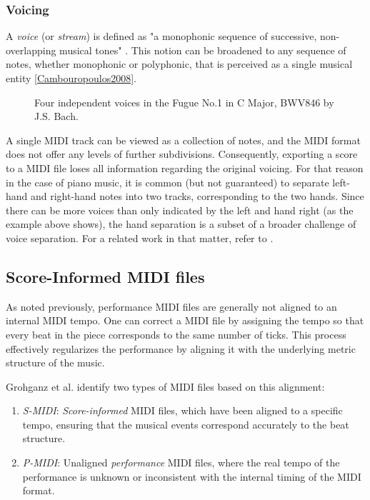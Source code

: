 \subsubsection{Voicing}

A \emph{voice} (or \emph{stream}) is defined as "a monophonic sequence of successive, non-overlapping musical tones" \cite{Karydis2007}. This notion can be broadened to any sequence of notes, whether monophonic or polyphonic, that is perceived as a single musical entity \ref{Cambouropoulos2008}.

\begin{figure}[ht!]
\centering

\caption[Four independent voices in the Fugue No.1 in C Major, BWV846 by J.S. Bach.]{Four independent voices in the Fugue No.1 in C Major, BWV846 by J.S. Bach.}
\end{figure}

A single MIDI track can be viewed as a collection of notes, and the MIDI format does not offer any levels of further subdivisions. Consequently, exporting a score to a MIDI file loses all information regarding the original voicing. For that reason in the case of piano music, it is common (but not guaranteed) to separate left-hand and right-hand notes into two tracks, corresponding to the two hands. Since there can be more voices than only indicated by the left and hand right (as the example above shows), the hand separation is a subset of a broader challenge of voice separation. For a related work in that matter, refer to \cite{Karydis2007}.
	
\subsection{Score-Informed MIDI files}\label{score-informed_midi_files}

As noted previously, performance MIDI files are generally not aligned to an internal MIDI tempo. One can correct a MIDI file by assigning the tempo so that every beat in the piece corresponds to the same number of ticks. This process effectively regularizes the performance by aligning it with the underlying metric structure of the music.

Grohganz et al. \cite{Grohganz2014} identify two types of MIDI files based on this alignment: \begin{enumerate}
	\item \emph{S-MIDI}: \emph{Score-informed} MIDI files, which have been aligned to a specific tempo, ensuring that the musical events correspond accurately to the beat structure.
	\item \emph{P-MIDI}: Unaligned \emph{performance} MIDI files, where the real tempo of the performance is unknown or inconsistent with the internal timing of the MIDI format. \end{enumerate}

